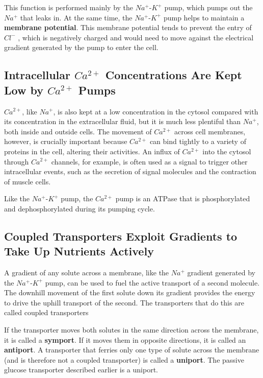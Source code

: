 This function is performed mainly by the $Na^{+}$-$K^{+}$ pump, which pumps
out the $Na^{+}$ that leaks in. At the same time, the $Na^{+}$-$K^{+}$ pump helps to
maintain a \textbf{membrane potential}. This membrane
potential tends to prevent the entry of $Cl^{-}$ , which is negatively charged
and would need to move against the electrical gradient generated by the
pump to enter the cell.

\subsection{Intracellular $Ca^{2+}$ Concentrations Are Kept Low by $Ca^{2+}$ Pumps}

$Ca^{2+}$, like $Na^{+}$, is also kept at a low concentration in the cytosol compared
with its concentration in the extracellular fluid, but it is much less plentiful
than $Na^{+}$, both inside and outside cells. The movement of $Ca^{2+}$ across
cell membranes, however, is crucially important because $Ca^{2+}$ can bind
tightly to a variety of proteins in the cell, altering their activities. An influx
of $Ca^{2+}$ into the cytosol through $Ca^{2+}$ channels, for example, is often used
as a signal to trigger other intracellular events, such as the secretion of
signal molecules and the contraction of muscle cells.


Like the $Na^{+}$-$K^{+}$ pump, the $Ca^{2+}$ pump is an ATPase that is phosphorylated and dephosphorylated during its pumping cycle.

\subsection{Coupled Transporters Exploit Gradients to Take Up Nutrients Actively}

A gradient of any solute across a membrane, like the $Na^{+}$ gradient generated
by the $Na^{+}$-$K^{+}$ pump, can be used to fuel the active transport of
a second molecule. The downhill movement of the first solute down its
gradient provides the energy to drive the uphill transport of the second.
The transporters that do this are called coupled transporters

If the transporter moves both solutes in the same direction across the membrane,
it is called a \textbf{symport}. If it moves them in opposite directions,
it is called an \textbf{antiport}. A transporter that ferries only one type of
solute across the membrane (and is therefore not a coupled transporter)
is called a \textbf{uniport}. The passive glucose transporter described earlier is a uniport.

